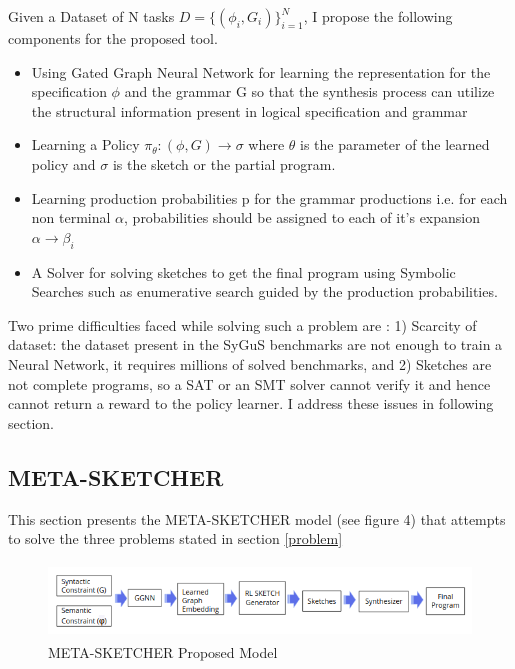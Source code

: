 Given a Dataset of N tasks $D = \{(\phi_i, G_i)\}_{i=1}^{N}$, I propose the following components for the proposed tool.

\begin{itemize}
    \item Using Gated Graph Neural Network for learning the representation for the specification $\phi$ and the grammar G so that the synthesis process can utilize the structural information present in logical specification and grammar
    \item Learning a Policy $\pi_{\theta} : (\phi, G) \rightarrow \sigma$ where $\theta$ is the parameter of the learned policy and $\sigma$ is the sketch or the partial program.
    \item Learning production probabilities p for the grammar productions i.e. for each non terminal $\alpha$, probabilities should be assigned to each of it's expansion $ \alpha \rightarrow \beta_{i} $
    \item A Solver for solving sketches to get the final program using Symbolic Searches such as  enumerative search guided by the production probabilities.
\end{itemize}

Two prime difficulties faced while solving such a problem are : 1) Scarcity of dataset: the dataset present in the SyGuS benchmarks are not enough to train a Neural Network, it requires millions of solved benchmarks, and 2) Sketches are not complete programs, so a SAT or an SMT solver cannot verify it and hence cannot return a reward to the policy learner. I address these issues in following section.

\subsection{META-SKETCHER}
\label{headings}

This section presents the META-SKETCHER model (see figure 4) that attempts to solve the three problems stated in section \ref{problem}

\begin{figure}[!htp]
\label{metasketcher}
\centering
\includegraphics[width=\textwidth,height=2.0cm]{metasketcher.png}
\vspace*{-0.9cm}
\caption{META-SKETCHER Proposed Model}
\vspace{-1.2em}
\end{figure}

